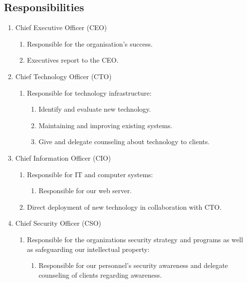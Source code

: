 \subsection{Responsibilities}

\begin{enumerate}
  \item Chief Executive Officer (CEO)
   \begin{enumerate}
      \item Responsible for the organisation's success.
      \item Executives report to the CEO.
  \end{enumerate}
  \item Chief Technology Officer (CTO)
   \begin{enumerate}
      \item Responsible for technology infrastructure:
      \begin{enumerate}
        \item Identify and evaluate new technology.
        \item Maintaining and improving existing systems.
        \item Give and delegate counseling about technology to clients.
      \end{enumerate}
  \end{enumerate}
  \item Chief Information Officer (CIO)
   \begin{enumerate}
      \item Responsible for IT and computer systems:
      \begin{enumerate}
          \item Responsible for our web server.
      \end{enumerate}
      \item Direct deployment of new technology in collaboration with CTO.
  \end{enumerate}
  \item Chief Security Officer (CSO)
   \begin{enumerate}
      \item Responsible for the organizations security strategy and programs as well as safeguarding our intellectual property:
      \begin{enumerate}
          \item Responsible for our personnel's security awareness and delegate counseling of clients regarding awareness.
      \end{enumerate}

\end{enumerate}
\end{enumerate}
